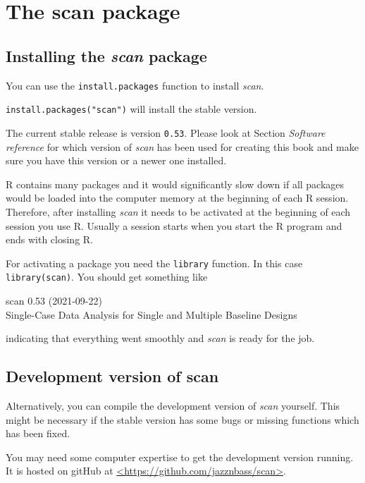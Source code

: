 \documentclass[
]{book}
\begin{document}
\hypertarget{the-scan-package}{%
\chapter{The scan package}\label{the-scan-package}}

\hypertarget{installing-the-scan-package}{%
\section{\texorpdfstring{Installing the \emph{scan} package}{Installing the scan package}}\label{installing-the-scan-package}}

You can use the \texttt{install.packages} function to install \emph{scan}.

\texttt{install.packages("scan")} will install the stable version.

The current stable release is version \texttt{0.53}. Please look at Section \emph{Software reference} for which version of \emph{scan} has been used for creating this book and make sure you have this version or a newer one installed.

R contains many packages and it would significantly slow down if all packages would be loaded into the computer memory at the beginning of each R session. Therefore, after installing \emph{scan} it needs to be activated at the beginning of each session you use R. Usually a session starts when you start the R program and ends with closing R.

For activating a package you need the \texttt{library} function. In this case \texttt{library(scan)}. You should get something like

scan 0.53 (2021-09-22)\\
Single-Case Data Analysis for Single and Multiple Baseline Designs

indicating that everything went smoothly and \emph{scan} is ready for the job.

\hypertarget{development-version-of-scan}{%
\section{Development version of scan}\label{development-version-of-scan}}

Alternatively, you can compile the development version of \emph{scan} yourself. This might be necessary if the stable version has some bugs or missing functions which has been fixed.

You may need some computer expertise to get the development version running. It is hosted on gitHub at \href{https://github.com/jazznbass/scan}{\textless https://github.com/jazznbass/scan\textgreater{}}.
\end{document}
